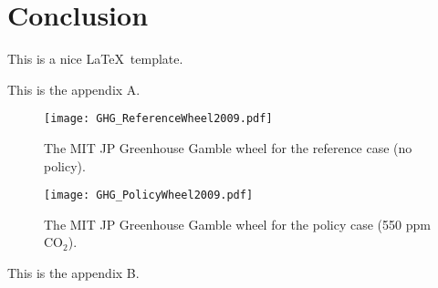 \documentclass[12pt,fleqn]{article}
\begin{document}
\section{Conclusion}

This is a nice \LaTeX\, template.


\nocite{*}





\newpage
\appendix


This is the appendix A.

\begin{figure}[h!]
  \centering
  \noindent\texttt{[image: GHG\_ReferenceWheel2009.pdf]}\\
  \caption{The MIT JP Greenhouse Gamble wheel for the reference case (no policy).}\label{fig:jpwheelnopolicy}
\end{figure}

\begin{figure}[h!]
  \centering
  \noindent\texttt{[image: GHG\_PolicyWheel2009.pdf]}\\
  \caption{The MIT JP Greenhouse Gamble wheel for the policy case (550 ppm CO$_{2}$).}\label{fig:jpwheel550policy}
\end{figure}

\newpage

\appsection{}

This is the appendix B.
\end{document}
